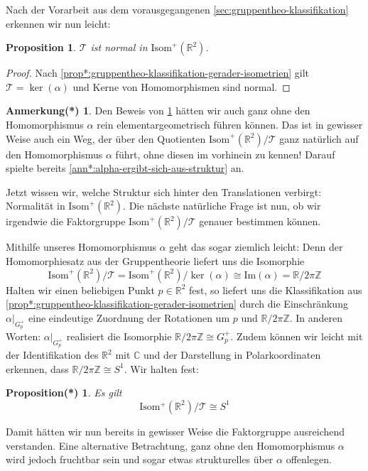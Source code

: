 \documentclass[a4paper, ngerman]{article}
\newcounter{chapter}
\numberwithin{equation}{chapter}
\theoremstyle{plain}
\newtheorem{proposition}{Proposition}[chapter]
\newtheorem{propositionstrd}{Proposition(*)}[chapter]
\theoremstyle{definition}
\newtheorem{annotationstrd}{Anmerkung(*)}[chapter]
\newcommand{\geradisometr}{\ensuremath{\mathrm{Isom}^+(\mathbb R^2)}}
\begin{document}
Nach der Vorarbeit aus dem vorausgegangenen \cref{sec:gruppentheo-klassifikation} erkennen wir nun leicht: 
\begin{proposition}\label{prop:normale-translationen}
    \(\mathcal T\) ist normal in \(\geradisometr\). 
\end{proposition}
\begin{proof}
    Nach \cref{prop*:gruppentheo-klassifikation-gerader-isometrien} gilt \(\mathcal T = \ker(\alpha)\) und Kerne von Homomorphismen sind normal. 
\end{proof}
\begin{annotationstrd}
    Den Beweis von \cref{prop:normale-translationen} hätten wir auch ganz ohne den Homomorphismus \(\alpha\) rein elementargeometrisch führen können. Das ist in gewisser Weise auch ein Weg, der über den Quotienten \(\geradisometr/\mathcal T\) ganz natürlich auf den Homomorphismus \(\alpha\) führt, ohne diesen im vorhinein zu kennen! Darauf spielte bereits \cref{ann*:alpha-ergibt-sich-aus-struktur} an.
\end{annotationstrd}
\noindent Jetzt wissen wir, welche Struktur sich hinter den Translationen verbirgt: Normalität in \(\geradisometr\). Die nächste natürliche Frage ist nun, ob wir irgendwie die Faktorgruppe \(\geradisometr /\mathcal T\) genauer bestimmen können. 

Mithilfe unseres Homomorphismus \(\alpha\) geht das sogar ziemlich leicht: Denn der Homomorphiesatz aus der Gruppentheorie liefert uns die Isomorphie 
\begin{equation*}
    \geradisometr/\mathcal T = \geradisometr/\ker(\alpha) \cong \mathrm{Im}(\alpha) = \mathbb R/2\pi\mathbb Z
\end{equation*}
Halten wir einen beliebigen Punkt \(p\in \mathbb R^2\) fest, so liefert uns die Klassifikation aus \cref{prop*:gruppentheo-klassifikation-gerader-isometrien} durch die Einschränkung \(\alpha|_{G_p^+}\) eine eindeutige Zuordnung der Rotationen um \(p\) und \(\mathbb R/2\pi\mathbb Z\). In anderen Worten: \(\alpha|_{G_p^+}\) realisiert die Isomorphie \(\mathbb R/2\pi\mathbb Z \cong G_p^+\). Zudem können wir leicht mit der Identifikation des \(\mathbb R^2\) mit \(\mathbb C\) und der Darstellung in Polarkoordinaten erkennen, dass \(\mathbb R/2\pi\mathbb Z\cong S^1\). Wir halten fest: 
\begin{propositionstrd}\label{prop*:gestalt-quotient-über-translationen}
    Es gilt 
    \begin{equation*}
        \mathrm{Isom^+(\mathbb R^2)}/\mathcal T \cong S^1 
    \end{equation*}
\end{propositionstrd}
\noindent Damit hätten wir nun bereits in gewisser Weise die Faktorgruppe ausreichend verstanden. Eine alternative Betrachtung, ganz ohne den Homomorphismus \(\alpha\) wird jedoch fruchtbar sein und sogar etwas strukturelles über \(\alpha\) offenlegen. 
\end{document}
